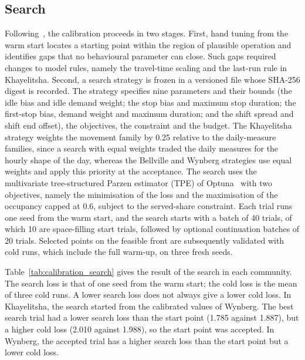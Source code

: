 \subsection{Search}

Following~\cite{thiele2014_abm_parameter_estimation}, the calibration proceeds in two stages. First, hand tuning from the warm start locates a starting point within the region of plausible operation and identifies gaps that no behavioural parameter can close. Such gaps required changes to model rules, namely the travel-time scaling and the last-run rule in Khayelitsha. Second, a search strategy is frozen in a versioned file whose SHA-256 digest is recorded. The strategy specifies nine parameters and their bounds (the idle bias and idle demand weight; the stop bias and maximum stop duration; the first-stop bias, demand weight and maximum duration; and the shift spread and shift end offset), the objectives, the constraint and the budget. The Khayelitsha strategy weights the movement family by 0.25 relative to the daily-measure families, since a search with equal weights traded the daily measures for the hourly shape of the day, whereas the Bellville and Wynberg strategies use equal weights and apply this priority at the acceptance. The search uses the multivariate tree-structured Parzen estimator (TPE) of Optuna~\cite{akiba2019_optuna} with two objectives, namely the minimisation of the loss and the maximisation of the occupancy capped at 0.6, subject to the served-share constraint. Each trial runs one seed from the warm start, and the search starts with a batch of 40 trials, of which 10 are space-filling start trials, followed by optional continuation batches of 20 trials. Selected points on the feasible front are subsequently validated with cold runs, which include the full warm-up, on three fresh seeds.

Table~\ref{tab:calibration_search} gives the result of the search in each community. The search loss is that of one seed from the warm start; the cold loss is the mean of three cold runs. A lower search loss does not always give a lower cold loss. In Khayelitsha, the search started from the calibrated values of Wynberg. The best search trial had a lower search loss than the start point (1.785 against 1.887), but a higher cold loss (2.010 against 1.988), so the start point was accepted. In Wynberg, the accepted trial has a higher search loss than the start point but a lower cold loss.

